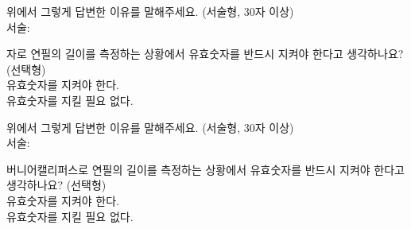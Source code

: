 \begin{graybox}\vspace*{0.2em}\bn
위에서 그렇게 답변한 이유를 말해주세요.
(서술형, 30자 이상) \\ 서술: 
\vspace*{2.4em}\end{graybox}\vspace{0.4em}


\clearpage


\bnset
\begin{graybox}\centering
{\fontsize{14pt}{17pt}\selectfont\bd{\an
\ItemTitlevi
}}\vspace*{0.8em}\end{graybox}\vspace{0.4em}

\begin{graybox}\vspace*{0.2em}\bn
자로 연필의 길이를 측정하는 상황에서 유효숫자를 반드시 지켜야 한다고 생각하나요?
(선택형) \\
\raisebox{-0.25ex}{\scalebox{1.4}{$\Box$}} 유효숫자를 지켜야 한다. \\
\raisebox{-0.25ex}{\scalebox{1.4}{$\Box$}} 유효숫자를 지킬 필요 없다.
\vspace*{0.4em}\end{graybox}\vspace{0.4em}

\begin{graybox}\vspace*{0.2em}\bn
위에서 그렇게 답변한 이유를 말해주세요.
(서술형, 30자 이상) \\ 서술: 
\vspace*{2.4em}\end{graybox}\vspace{0.4em}

\begin{graybox}\vspace*{0.2em}\bn
버니어캘리퍼스로 연필의 길이를 측정하는 상황에서 유효숫자를 반드시 지켜야 한다고 생각하나요?
(선택형) \\
\raisebox{-0.25ex}{\scalebox{1.4}{$\Box$}} 유효숫자를 지켜야 한다. \\
\raisebox{-0.25ex}{\scalebox{1.4}{$\Box$}} 유효숫자를 지킬 필요 없다.
\vspace*{0.4em}\end{graybox}\vspace{0.4em}


